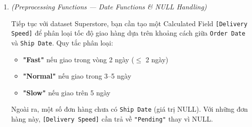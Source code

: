\documentclass[12pt]{article}
\begin{document}
\begin{enumerate}[label=\textbf{Câu \arabic*.}, leftmargin=*, labelsep=1em, itemsep=2em]
\begin{guidelinebox}
\begin{itemize}
    \item \textbf{Choice (c) đúng:}
    \begin{itemize}
        \item Field 1: \texttt{SPLIT([Order ID], "-", 1)} $\rightarrow$ \texttt{"CA"} \checkmark
        \item Field 2: \texttt{SPLIT([Order ID], "-", 2)} $\rightarrow$ \texttt{"2021"} \checkmark
        \item Field 3: \texttt{STARTSWITH([Order ID], "US")} $\rightarrow$ \checkmark
    \end{itemize}
    $\rightarrow$ \textbf{Tất cả 3 field đều đúng}, và \texttt{SPLIT} không phụ thuộc vị trí ký tự cố định.

    \item \textbf{Choice (d) sai:}
    \begin{itemize}
        \item Field 1: \texttt{SPLIT([Order ID], "-", 2)} $\rightarrow$ \texttt{"2021"}  (đây là năm, không phải mã khu vực)
        \item Field 2: \texttt{SPLIT([Order ID], "-", 3)} $\rightarrow$ \texttt{"152156"}  (đây là mã đơn hàng, không phải năm)
    \end{itemize}
    $\rightarrow$ \textbf{Field 1 và Field 2 đều sai} vì token\_number bị lệch.
\end{itemize}

\end{guidelinebox}

\newpage


\item \textit{(Preprocessing Functions --- Date Functions \& NULL Handling)}

Tiếp tục với dataset Superstore, bạn cần tạo một Calculated Field \texttt{[Delivery Speed]} để phân loại tốc độ giao hàng dựa trên khoảng cách giữa \texttt{Order Date} và \texttt{Ship Date}. Quy tắc phân loại:
\begin{itemize}
    \item \textbf{"Fast"} nếu giao trong vòng 2 ngày ($\leq$ 2 ngày)
    \item \textbf{"Normal"} nếu giao trong 3--5 ngày
    \item \textbf{"Slow"} nếu giao trên 5 ngày
\end{itemize}

Ngoài ra, một số đơn hàng chưa có \texttt{Ship Date} (giá trị NULL). Với những đơn hàng này, \texttt{[Delivery Speed]} cần trả về \texttt{"Pending"} thay vì NULL.


\end{enumerate}
\end{document}
